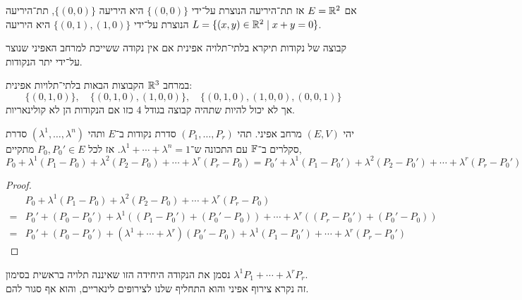 \begin{example}
	אם $E = \mathbb{R}^2$ אז תת־היריעה הנוצרת על־ידי $\{ (0, 0) \}$ היא היריעה $\{ (0, 0) \}$, תת־היריעה הנוצרת על־ידי $\{ (0, 1), (1, 0) \}$ היא היריעה $L = \{ (x, y) \in \mathbb{R}^2 \mid x + y = 0 \}$.
\end{example}
\begin{definition}
	קבוצה של נקודות תיקרא בלתי־תלויה אפינית אם אין נקודה ששייכת למרחב האפיני שנוצר על־ידי יתר הנקודות.
\end{definition}
\begin{example}
	במרחב $\mathbb{R}^3$ הקבוצות הבאות בלתי־תלויות אפינית:
	\[
		\{ (0, 1, 0) \},
		\quad
		\{ (0, 1, 0), (1, 0, 0) \},
		\quad
		\{ (0, 1, 0), (1, 0, 0), (0, 0, 1) \}
	\]
	אך לא יכול להיות שתהיה קבוצה בגודל $4$ כזו אם הנקודות הן לא קולינאריות.
\end{example}
\begin{theorem}
	יהי $(E, V)$ מרחב אפיני.
	תהי $(P_1, \ldots, P_r)$ סדרת נקודות ב־$E$ ותהי $(\lambda^1, \ldots, \lambda^n)$ סדרת סקלרים ב־$\mathbb{F}$ עם התכונה ש־$\lambda^1 + \cdots + \lambda^n = 1$.
	אז לכל $P_0, P_0' \in E$ מתקיים,
	\[
		P_0 + \lambda^1 (P_1 - P_0) + \lambda^2 (P_2 - P_0) + \cdots + \lambda^r (P_r - P_0)
		= P_0' + \lambda^1 (P_1 - P_0') + \lambda^2 (P_2 - P_0') + \cdots + \lambda^r (P_r - P_0')
	\]
\end{theorem}
\begin{proof}
	\begin{align*}
		& P_0 + \lambda^1 (P_1 - P_0) + \lambda^2 (P_2 - P_0) + \cdots + \lambda^r (P_r - P_0) \\
		= & P_0' + (P_0 - P_0') + \lambda^1 ((P_1 - P_0') + (P_0' - P_0)) + \cdots + \lambda^r ((P_r - P_0') + (P_0' - P_0)) \\
		= & P_0' + (P_0 - P_0') + (\lambda^1 + \cdots + \lambda^r) (P_0' - P_0) + \lambda^1 (P_1 - P_0') + \cdots + \lambda^r (P_r - P_0')
	\end{align*}
\end{proof}
\begin{notation}
	נסמן את הנקודה היחידה הזו שאיננה תלויה בראשית בסימון $\lambda^1 P_1 + \cdots + \lambda^r P_r$. \\
	זה נקרא צירוף אפיני והוא התחליף שלנו לצירופים לינאריים, והוא אף סגור להם.
\end{notation}

\listoftheorems[title=הגדרות ומשפטים,ignoreall,show={theorem,definition},swapnumber,onlynamed={proposition,lemma}]


